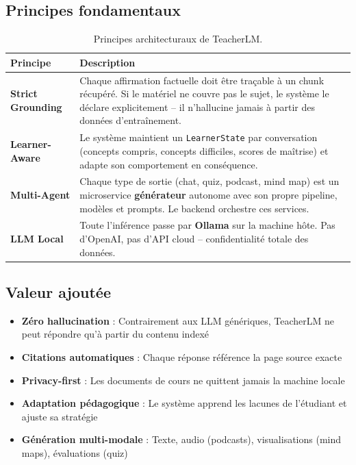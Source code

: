 \documentclass[12pt,a4paper]{article}
\begin{document}
\subsection{Principes fondamentaux}

\begin{table}[H]
    \centering
    \begin{tabularx}{\textwidth}{@{}lX@{}}
        \toprule
        \textbf{Principe} & \textbf{Description} \\
        \midrule
        \textbf{Strict Grounding} & Chaque affirmation factuelle doit être traçable à un chunk récupéré. Si le matériel ne couvre pas le sujet, le système le déclare explicitement -- il n'hallucine jamais à partir des données d'entraînement. \\
        \addlinespace
        \textbf{Learner-Aware} & Le système maintient un \texttt{LearnerState} par conversation (concepts compris, concepts difficiles, scores de maîtrise) et adapte son comportement en conséquence. \\
        \addlinespace
        \textbf{Multi-Agent} & Chaque type de sortie (chat, quiz, podcast, mind map) est un microservice \textbf{générateur} autonome avec son propre pipeline, modèles et prompts. Le backend orchestre ces services. \\
        \addlinespace
        \textbf{LLM Local} & Toute l'inférence passe par \textbf{Ollama} sur la machine hôte. Pas d'OpenAI, pas d'API cloud -- confidentialité totale des données. \\
        \bottomrule
    \end{tabularx}
    \caption{Principes architecturaux de TeacherLM.}
\end{table}

\subsection{Valeur ajoutée}

\begin{itemize}
    \item \textbf{Zéro hallucination} : Contrairement aux LLM génériques, TeacherLM ne peut répondre qu'à partir du contenu indexé
    \item \textbf{Citations automatiques} : Chaque réponse référence la page source exacte
    \item \textbf{Privacy-first} : Les documents de cours ne quittent jamais la machine locale
    \item \textbf{Adaptation pédagogique} : Le système apprend les lacunes de l'étudiant et ajuste sa stratégie
    \item \textbf{Génération multi-modale} : Texte, audio (podcasts), visualisations (mind maps), évaluations (quiz)
\end{itemize}
\end{document}
